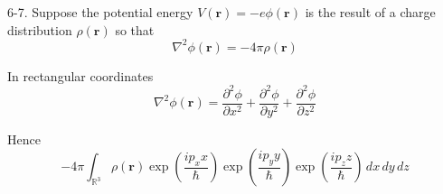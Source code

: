 \documentclass[12pt]{article}
\newcommand\INT{\int_{\mathbb R^3}}
\begin{document}
6-7.
Suppose the potential energy $V(\mathbf r)=-e\phi(\mathbf r)$
is the result of a charge distribution $\rho(\mathbf r)$ so that
\begin{equation*}
\nabla^2\phi(\mathbf r)=-4\pi\rho(\mathbf r)
\tag{6.48}
\end{equation*}

In rectangular coordinates
\begin{equation*}
\nabla^2\phi(\mathbf r)
=\frac{\partial^2\phi}{\partial x^2}
+\frac{\partial^2\phi}{\partial y^2}
+\frac{\partial^2\phi}{\partial z^2}
\end{equation*}

Hence
\begin{equation*}
-4\pi\INT\rho(\mathbf r)
\exp\left(\frac{ip_xx}{\hbar}\right)
\exp\left(\frac{ip_yy}{\hbar}\right)
\exp\left(\frac{ip_zz}{\hbar}\right)
\,dx\,dy\,dz
\end{equation*}
\end{document}
